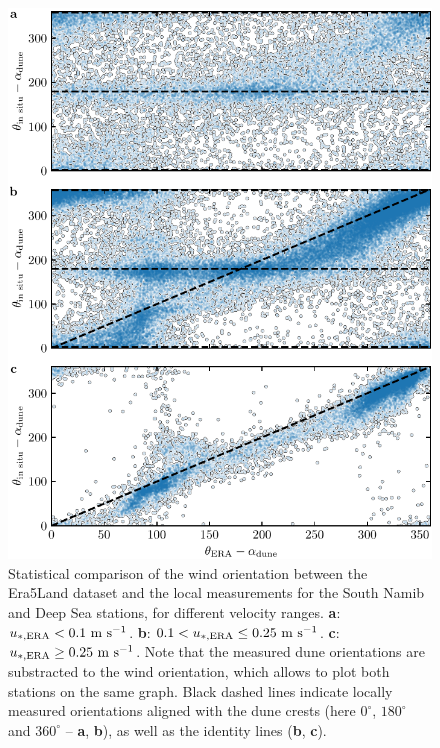 \begin{figure}
  \centering
  \includegraphics[scale=1]{Figures/Figure7_supp.pdf}
  \caption{Statistical comparison of the wind orientation between the Era5Land dataset and the local measurements for the South Namib and Deep Sea stations, for different velocity ranges. \textbf{a}: $u_{*, \textup{\textup{ERA}}} < 0.1~\textup{m}~\textup{s}^{-1}$. \textbf{b}: $0.1 < u_{*, \textup{\textup{ERA}}} \leq 0.25~\textup{m}~\textup{s}^{-1}$. \textbf{c}: $u_{*, \textup{\textup{ERA}}} \geq 0.25~\textup{m}~\textup{s}^{-1}$. Note that the measured dune orientations are substracted to the wind orientation, which allows to plot both stations on the same graph. Black dashed lines indicate locally measured orientations aligned with the dune crests (here $0^\circ$, $180^\circ$ and $360^\circ$ -- \textbf{a}, \textbf{b}), as well as the identity lines (\textbf{b}, \textbf{c}).}
  \label{Fig7_supp}
\end{figure}


